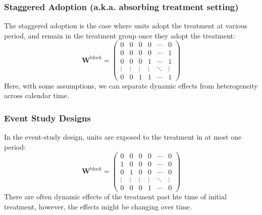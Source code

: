 \documentclass[twoside]{article}
\begin{document}
\subsubsection*{Staggered Adoption (a.k.a. absorbing treatment setting)}
The staggered adoption is the case where units adopt the treatment at various period, and remain in the treatment group once they adopt the treatment:
\begin{equation*}
    \mathbf{W}^{\text{block}} = \begin{pmatrix}
        0&0&0&0&\cdots &0\\
        0&0&0&0&\cdots &1\\
        0&0&0&1&\cdots &1\\
        \vdots &\vdots & \vdots & \vdots & \ddots & \vdots \\
        0&0&1&1&\cdots &1
    \end{pmatrix}
\end{equation*}
Here, with some assumptions, we can separate dynamic effects from heterogeneity across calendar time.

\subsubsection{Event Study Designs}
In the event-study design, units are exposed to the treatment in at most one period:
\begin{equation*}
    \mathbf{W}^{\text{block}} = \begin{pmatrix}
        0&0&0&0&\cdots &0\\
        1&0&0&0&\cdots &0\\
        0&1&0&0&\cdots &0\\
        \vdots &\vdots & \vdots & \vdots & \ddots & \vdots \\
        0&0&0&1&\cdots &0
    \end{pmatrix}
\end{equation*}
There are often dynamic effects of the treatment past hte time of initial treatment, however, the effects might be changing over time.
\end{document}

